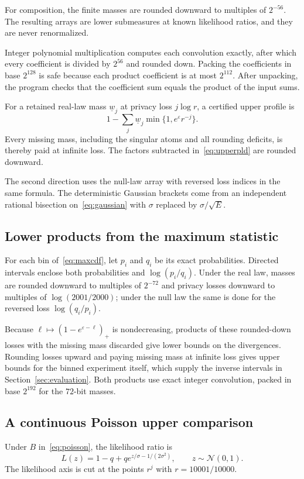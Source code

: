 \documentclass[conference]{IEEEtran}
\newcommand{\N}{\mathcal N}
\newcommand{\eps}{\varepsilon}
\begin{document}
For composition, the finite masses are rounded downward to multiples of $2^{-56}$. The resulting arrays are lower submeasures at known likelihood ratios, and they are never renormalized.

Integer polynomial multiplication computes each convolution exactly, after which every coefficient is divided by $2^{56}$ and rounded down. Packing the coefficients in base $2^{128}$ is safe because each product coefficient is at most $2^{112}$. After unpacking, the program checks that the coefficient sum equals the product of the input sums.

For a retained real-law mass $\underline w_j$ at privacy loss $j\log r$, a certified upper profile is
\begin{equation}\label{eq:upperpld}
 1-\sum_j\underline w_j\min\{1,e^\eps r^{-j}\}.
\end{equation}
Every missing mass, including the singular atoms and all rounding deficits, is thereby paid at infinite loss. The factors subtracted in~\eqref{eq:upperpld} are rounded downward.

The second direction uses the null-law array with reversed loss indices in the same formula. The deterministic Gaussian brackets come from an independent rational bisection on~\eqref{eq:gaussian} with $\sigma$ replaced by $\sigma/\sqrt E$.

\subsection{Lower products from the maximum statistic}
For each bin of~\eqref{eq:maxcdf}, let $p_i$ and $q_i$ be its exact probabilities. Directed intervals enclose both probabilities and $\log(p_i/q_i)$. Under the real law, masses are rounded downward to multiples of $2^{-72}$ and privacy losses downward to multiples of $\log(2001/2000)$; under the null law the same is done for the reversed loss $\log(q_i/p_i)$.

Because $\ell\mapsto(1-e^{\eps-\ell})_+$ is nondecreasing, products of these rounded-down losses with the missing mass discarded give lower bounds on the divergences. Rounding losses upward and paying missing mass at infinite loss gives upper bounds for the binned experiment itself, which supply the inverse intervals in Section~\ref{sec:evaluation}. Both products use exact integer convolution, packed in base $2^{192}$ for the $72$-bit masses.

\subsection{A continuous Poisson upper comparison}
Under $B$ in~\eqref{eq:poisson}, the likelihood ratio is
\[
 L(z)=1-q+qe^{z/\sigma-1/(2\sigma^2)},\qquad z\sim\N(0,1).
\]
The likelihood axis is cut at the points $r^j$ with $r=10001/10000$.
\end{document}
